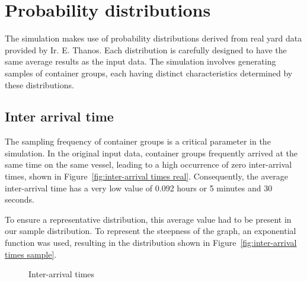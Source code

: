 \documentclass{article}
\begin{document}
\section{Probability distributions}
The simulation makes use of probability distributions derived from real yard
data provided by Ir. E. Thanos. Each distribution is carefully designed to have
the same average results as the input data. The simulation involves generating
samples of container groups, each having distinct characteristics determined by
these distributions.

\subsection{Inter arrival time}
The sampling frequency of container groups is a critical parameter in the
simulation. In the original input data, container groups frequently arrived at
the same time on the same vessel, leading to a high occurrence of zero
inter-arrival times, shown in Figure~\ref{fig:inter-arrival times real}.
Consequently, the average inter-arrival time has a very low value of 0.092
hours or 5 minutes and 30 seconds.

To ensure a representative distribution, this average value had to be present
in our sample distribution. To represent the steepness of the graph, an
exponential function was used, resulting in the distribution shown in
Figure~\ref{fig:inter-arrival times sample}.

\begin{figure}[!tbp]
    \centering
    \hfill
    \caption{Inter-arrival times}
\end{figure}
\end{document}
